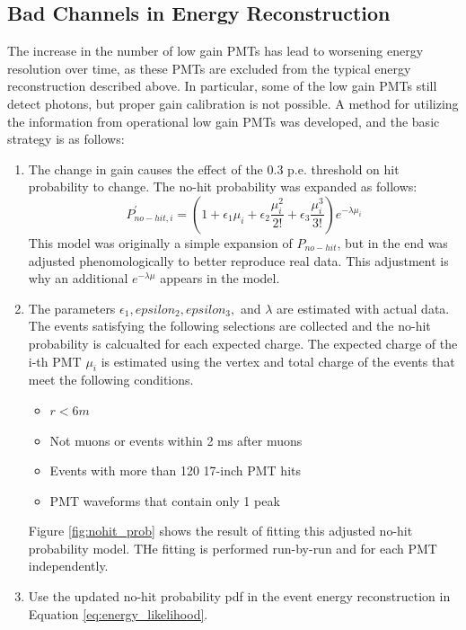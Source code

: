 \subsection{Bad Channels in Energy Reconstruction}
The increase in the number of low gain PMTs has lead to worsening energy resolution over time, as these PMTs are excluded from the typical energy reconstruction described above. In particular, some of the low gain PMTs still detect photons, but proper gain calibration is not possible. A method for utilizing the information from operational low gain PMTs was developed, and the basic strategy is as follows:
\begin{enumerate}
	\item The change in gain causes the effect of the 0.3 p.e. threshold on hit probability to change. The no-hit probability was expanded as follows:
	\begin{equation}
		P^{\prime}_{no-hit, i} = \left(1+\epsilon_1\mu_i+\epsilon_2\frac{\mu_i^2}{2!}+\epsilon_3\frac{\mu_i^3}{3!}\right)e^{-\lambda\mu_i}
	\end{equation}
	This model was originally a simple expansion of $P_{no-hit}$, but in the end was adjusted phenomologically to better reproduce real data. This adjustment is why an additional $e^{-\lambda\mu}$ appears in the model.
	\item The parameters $\epsilon_1, epsilon_2, epsilon_3,$ and $\lambda$ are estimated with actual data. The events satisfying the following selections are collected and the no-hit probability is calcualted for each expected charge. The expected charge of the i-th PMT $\mu_i$ is estimated using the vertex and total charge of the events that meet the following conditions.
	\begin{itemize}
		\item $r<6m$
		\item Not muons or events within 2 ms after muons
		\item Events with more than 120 17-inch PMT hits
		\item PMT waveforms that contain only 1 peak
	\end{itemize}
	Figure \ref{fig:nohit_prob} shows the result of fitting this adjusted no-hit probability model. THe fitting is performed run-by-run and for each PMT independently.
	\item Use the updated no-hit probability pdf in the event energy reconstruction in Equation \ref{eq:energy_likelihood}.
\end{enumerate}
